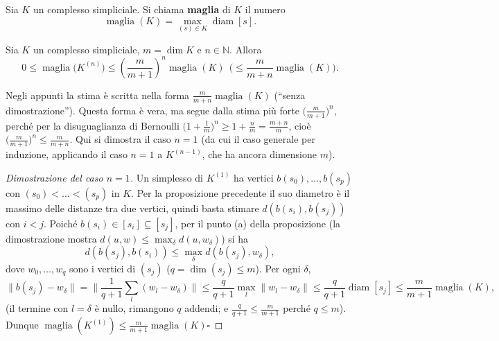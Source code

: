 \begin{definicion}[Maglia]
Sia $K$ un complesso simpliciale. Si chiama \textbf{maglia} di $K$ il numero
\[
\operatorname{maglia}(K) = \max_{(s) \in K} \operatorname{diam}[s].
\]
\end{definicion}

\begin{teo}
Sia $K$ un complesso simpliciale, $m = \dim K$ e $n \in \mathbb{N}$. Allora
\[
0 \leqslant \operatorname{maglia}\big(K^{(n)}\big) \leqslant \left( \frac{m}{m+1} \right)^{n} \operatorname{maglia}(K) \ \ \Big( \leqslant \frac{m}{m+n} \operatorname{maglia}(K) \Big).
\]
\end{teo}

\begin{observacion}
Negli appunti la stima \`e scritta nella forma $\frac{m}{m+n}\operatorname{maglia}(K)$ (``senza dimostrazione''). Questa forma \`e vera, ma segue dalla stima pi\`u forte $\big(\frac{m}{m+1}\big)^n$, perch\'e per la disuguaglianza di Bernoulli $\big(1 + \frac1m\big)^n \geqslant 1 + \frac nm = \frac{m+n}{m}$, cio\`e $\big(\frac{m}{m+1}\big)^n \leqslant \frac{m}{m+n}$. Qui si dimostra il caso $n=1$ (da cui il caso generale per induzione, applicando il caso $n = 1$ a $K^{(n-1)}$, che ha ancora dimensione $m$).
\end{observacion}

\begin{proof}[Dimostrazione del caso $n=1$]
Un simplesso di $K^{(1)}$ ha vertici $b(s_0), \dots, b(s_p)$ con $(s_0) < \dots < (s_p)$ in $K$. Per la proposizione precedente il suo diametro \`e il massimo delle distanze tra due vertici, quindi basta stimare $d(b(s_i), b(s_j))$ con $i < j$. Poich\'e $b(s_i) \in [s_i] \subseteq [s_j]$, per il punto (a) della proposizione (la dimostrazione mostra $d(u, w) \leqslant \max_\delta d(u, w_\delta)$) si ha
\[
d(b(s_j), b(s_i)) \leqslant \max_{\delta} d(b(s_j), w_\delta),
\]
dove $w_0, \dots, w_q$ sono i vertici di $(s_j)$ ($q = \dim (s_j) \leqslant m$). Per ogni $\delta$,
\[
\|b(s_j) - w_\delta\| = \Big\| \frac{1}{q+1} \sum_{l} (w_l - w_\delta) \Big\| \leqslant \frac{q}{q+1} \max_l \|w_l - w_\delta\| \leqslant \frac{q}{q+1} \operatorname{diam}[s_j] \leqslant \frac{m}{m+1} \operatorname{maglia}(K),
\]
(il termine con $l = \delta$ \`e nullo, rimangono $q$ addendi; e $\frac{q}{q+1} \leqslant \frac{m}{m+1}$ perch\'e $q \leqslant m$). Dunque $\operatorname{maglia}(K^{(1)}) \leqslant \frac{m}{m+1} \operatorname{maglia}(K)$\hfill$\square$
\end{proof}

